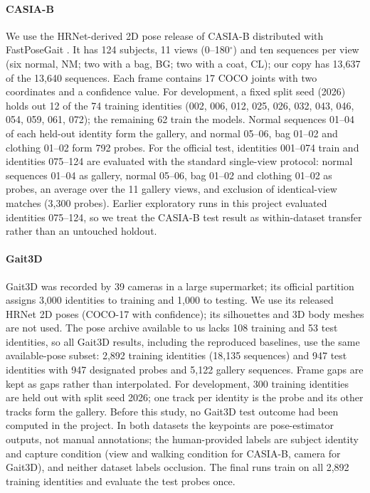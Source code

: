 \documentclass[review,12pt]{elsarticle}
\begin{document}
\paragraph{CASIA-B}
We use the HRNet-derived \cite{sun2019hrnet} 2D pose release of CASIA-B
\cite{yu2006casia} distributed with FastPoseGait \cite{meng2023fastposegait}.
It has 124 subjects, 11 views (0--180$^\circ$) and ten sequences per view
(six normal, NM; two with a bag, BG; two with a coat, CL); our copy has 13,637
of the 13,640 sequences. Each frame contains 17 COCO joints \cite{lin2014coco} with two
coordinates and a confidence value. For development, a fixed split seed (2026) holds out 12 of
the 74 training identities (002, 006, 012, 025, 026, 032, 043, 046, 054, 059,
061, 072); the remaining 62 train the models. Normal sequences 01--04 of each
held-out identity form the gallery, and normal 05--06, bag 01--02 and clothing
01--02 form 792 probes. For
the official test, identities 001--074 train and identities 075--124 are
evaluated with the standard single-view protocol: normal sequences 01--04 as
gallery, normal 05--06, bag 01--02 and clothing 01--02 as probes, an average
over the 11 gallery views, and exclusion of identical-view matches (3,300
probes). Earlier exploratory runs in this project evaluated identities
075--124, so we treat the CASIA-B test result as within-dataset transfer rather
than an untouched holdout.

\paragraph{Gait3D}
Gait3D \cite{zheng2022gait3d} was recorded by 39 cameras in a large supermarket; its
official partition assigns 3,000 identities to training and 1,000 to testing.
We use its released HRNet 2D poses (COCO-17 with confidence); its silhouettes
and 3D body meshes are not used. The pose archive
available to us lacks 108 training and 53 test identities, so all Gait3D
results, including the reproduced baselines, use the same available-pose
subset: 2,892 training identities (18,135 sequences) and 947 test identities
with 947 designated probes and 5,122 gallery sequences. Frame gaps are kept as
gaps rather than interpolated. For development, 300 training identities are
held out with split seed 2026; one track per identity is the probe and its
other tracks form the gallery. Before this study, no Gait3D test outcome had
been computed in the project. In both datasets the keypoints are pose-estimator
outputs, not manual annotations; the human-provided labels are subject identity
and capture condition (view and walking condition for CASIA-B, camera for
Gait3D), and neither dataset labels occlusion. The final runs train on all 2,892 training
identities and evaluate the test probes once.
\end{document}
